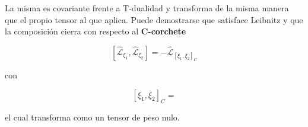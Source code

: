 \documentclass{article}
\numberwithin{equation}{section}
\begin{document}
La misma es covariante frente a T-dualidad y transforma de la misma manera que el propio tensor al que aplica. Puede demostrarse que satisface Leibnitz y que la composición cierra con respecto al \textbf{C-corchete}

\begin{equation}\label{key}
\left[\hat{\mathcal{L}}_{\xi_1},\hat{\mathcal{L}}_{\xi_2}\right] = -\hat{\mathcal{L}}_{\left[\xi_1,\xi_2\right]_C}
\end{equation}

con

\begin{equation}\label{key}
\left[\xi_1,\xi_2\right]_C=
\end{equation}

el cual transforma como un tensor de peso nulo.
\end{document}
